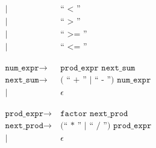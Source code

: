 \begin{align*}
            |&\ \texttt{`` < ''}\\
            |&\ \texttt{`` > ''}\\
            |&\ \texttt{`` >= ''}\\
            |&\ \texttt{`` <= ''}\\
	\phantom{0}\\
	\texttt{num\_expr}
	\rightarrow&\ \texttt{prod\_expr next\_sum}\\
	\texttt{next\_sum}
	\rightarrow&\ \texttt{( `` + '' | `` - '') num\_expr}\\
            |&\ \epsilon\\
	\phantom{0}\\
	\texttt{prod\_expr}
	\rightarrow&\ \texttt{factor next\_prod}\\
	\texttt{next\_prod}
	\rightarrow&\ \texttt{(`` * '' | `` / '') prod\_expr}\\
            |&\ \epsilon\\
\end{align*}

